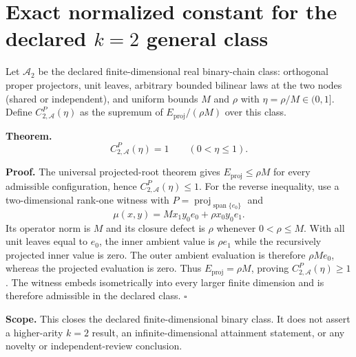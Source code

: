 \section*{Exact normalized constant for the declared $k=2$ general class}
\label{sec:k2-class-a-exact}

Let $\mathcal A_2$ be the declared finite-dimensional real binary-chain class:
orthogonal proper projectors, unit leaves, arbitrary bounded bilinear laws at
the two nodes (shared or independent), and uniform bounds $M$ and $\rho$ with
$\eta=\rho/M\in(0,1]$. Define $C_{2,\mathcal A}^P(\eta)$ as the supremum
of $E_{\mathrm{proj}}/(\rho M)$ over this class.

\textbf{Theorem.}
\[
  \boxed{C_{2,\mathcal A}^P(\eta)=1\qquad(0<\eta\le1).}
\]

\textbf{Proof.} The universal projected-root theorem gives
$E_{\mathrm{proj}}\le\rho M$ for every admissible configuration, hence
$C_{2,\mathcal A}^P(\eta)\le1$. For the reverse inequality, use a
two-dimensional rank-one witness with $P=\operatorname{proj}_{\operatorname{span}\{e_0\}}$
and
\[
  \mu(x,y)=M x_1y_0e_0+\rho x_0y_0e_1.
\]
Its operator norm is $M$ and its closure defect is $\rho$ whenever
$0<\rho\le M$. With all unit leaves equal to $e_0$, the inner ambient value
is $\rho e_1$ while the recursively projected inner value is zero. The outer
ambient evaluation is therefore $\rho M e_0$, whereas the projected
evaluation is zero. Thus $E_{\mathrm{proj}}=\rho M$, proving
$C_{2,\mathcal A}^P(\eta)\ge1$. The witness embeds isometrically into every
larger finite dimension and is therefore admissible in the declared class.
\hfill$\square$

\textbf{Scope.} This closes the declared finite-dimensional binary class.
It does not assert a higher-arity $k=2$ result, an infinite-dimensional
attainment statement, or any novelty or independent-review conclusion.
